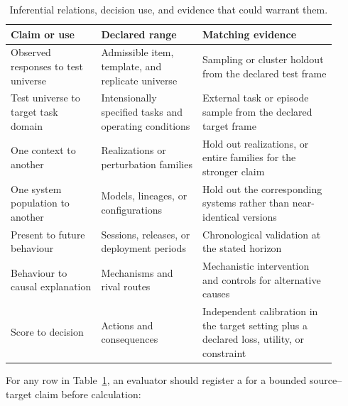 \documentclass[12pt]{article}
\begin{document}
\begin{table}[H]
\centering\small
\caption{Inferential relations, decision use, and evidence that could warrant them.}\label{tab:projection_relations}
\begin{tabular}{@{}>{\raggedright\arraybackslash}p{0.25\linewidth}
                    >{\raggedright\arraybackslash}p{0.29\linewidth}
                    >{\raggedright\arraybackslash}p{0.37\linewidth}@{}}
\toprule
Claim or use & Declared range & Matching evidence \\
\midrule
Observed responses to test universe & Admissible item, template, and replicate universe & Sampling or cluster holdout from the declared test frame \\
Test universe to target task domain & Intensionally specified tasks and operating conditions & External task or episode sample from the declared target frame \\
One context to another & Realizations or perturbation families & Hold out realizations, or entire families for the stronger claim \\
One system population to another & Models, lineages, or configurations & Hold out the corresponding systems rather than near-identical versions \\
Present to future behaviour & Sessions, releases, or deployment periods & Chronological validation at the stated horizon \\
Behaviour to causal explanation & Mechanisms and rival routes & Mechanistic intervention and controls for alternative causes \\
Score to decision & Actions and consequences & Independent calibration in the target setting plus a declared loss, utility, or constraint \\
\bottomrule
\end{tabular}
\end{table}
\thispagestyle{fancy}

For any row in Table~\ref{tab:projection_relations}, an evaluator should register a  for a bounded source--target claim before calculation:
\end{document}
